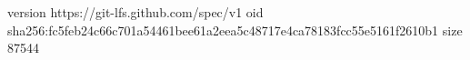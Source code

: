 version https://git-lfs.github.com/spec/v1
oid sha256:fc5feb24c66c701a54461bee61a2eea5c48717e4ca78183fcc55e5161f2610b1
size 87544
